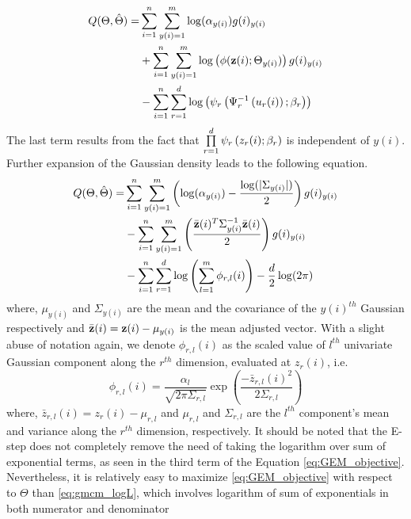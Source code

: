 \documentclass[]{article}
\begin{document}
\begin{align}
Q(\Theta,\hat{\Theta}) =& \sum\limits_{i=1}^n \sum\limits_{y(i)=1}^m  \log (\alpha_{y(i)})g(i)_{y(i)} \nonumber \\ 
& +\sum\limits_{i=1}^n \sum\limits_{y(i)=1}^m \log \left( \phi(\textbf{z}({i});\Theta_{y(i)}) \right)g(i)_{y(i)} \nonumber \\ 
& -\sum\limits_{i=1}^n \sum\limits_{r=1}^{d} \log \left( \psi_{r}\left(\Psi^{-1}_{r} \left( u_r{(i)} \right);\beta_r \right) \right)  
\end{align}
The last term results from the fact that $\prod\limits_{r=1}^{d}\psi_{r}\left(z_r({i});\beta_r \right)$ is independent of $y(i)$. Further expansion of the Gaussian density leads to the following equation.
\begin{align}\label{eq:GEM_objective}
Q(\Theta,\hat{\Theta}) =&  \sum\limits_{i=1}^n \sum\limits_{y(i)=1}^m  \left( \log (\alpha_{y(i)}) - \frac{\log(|\Sigma_{y(i)}|)}{2}\right) g(i)_{y(i)}  \nonumber \\ 
& -\sum\limits_{i=1}^n \sum\limits_{y(i)=1}^m  \left( \frac{\bar{\textbf{z}}({i})^T\Sigma_{y(i)}^{-1}\bar{\textbf{z}}({i})}{2} \right) g(i)_{y(i)}  \nonumber \\
& -\sum\limits_{i=1}^n \sum\limits_{r=1}^{d} \log \left(\sum\limits_{l=1}^{m} \phi_{r,l}(i)\right) -\frac{d}{2}\log(2\pi) 
\end{align}
where, $\mu_{y(i)}$ and $\Sigma_{y(i)}$ are the mean and the covariance of the $y(i)^{th}$ Gaussian respectively and  $\bar{\textbf{z}}({i})=\textbf{z}(i)-\mu_{y(i)}$ is the mean adjusted vector. With a slight abuse of notation again, we denote $\phi_{r,l}(i)$ as the scaled value of $l^{th}$ univariate Gaussian component along the $r^{th}$ dimension, evaluated at $z_r(i)$, i.e.
\begin{equation}
\phi_{r,l}(i)=\frac{\alpha_l}{\sqrt{2\pi\Sigma_{r,l}}} \exp\left( \frac{-\bar{z}_{r,l}(i)^2}{2\Sigma_{r,l}}\right)
\end{equation}
where, $\bar{z}_{r,l}(i)=z_r(i)-\mu_{r,l}$ and $\mu_{r,l}$ and $\Sigma_{r,l}$ are the $l^{th}$ component's mean and variance along the $r^{th}$ dimension, respectively. It should be noted that the E-step does not completely remove the need of taking the logarithm over sum of exponential terms, as seen in the third term of the Equation \ref{eq:GEM_objective}. Nevertheless, it is relatively easy to maximize \eqref{eq:GEM_objective} with respect to $\Theta$ than \eqref{eq:gmcm_logL}, which involves logarithm of sum of exponentials in both numerator and denominator
\end{document}
